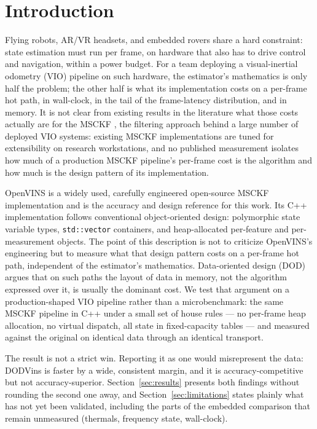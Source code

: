 \documentclass[10pt,conference,letterpaper]{IEEEtran}
\begin{document}
\section{Introduction}

Flying robots, AR/VR headsets, and embedded rovers share a hard constraint:
state estimation must run per frame, on hardware that also has to drive
control and navigation, within a power budget. For a team deploying a
visual-inertial odometry (VIO) pipeline on such hardware, the estimator's
mathematics is only half the problem; the other half is what its
implementation costs on a per-frame hot path, in wall-clock, in the tail of
the frame-latency distribution, and in memory. It is not clear from
existing results in the literature what those costs actually are for the
MSCKF \cite{mourikis2007msckf}, the filtering approach behind a large
number of deployed VIO systems: existing MSCKF implementations are tuned
for extensibility on research workstations, and no published measurement
isolates how much of a production MSCKF pipeline's per-frame cost is the
algorithm and how much is the design pattern of its implementation.

OpenVINS \cite{geneva2020openvins} is a widely used, carefully engineered
open-source MSCKF implementation and is the accuracy and design reference
for this work. Its C++ implementation follows conventional object-oriented
design: polymorphic state variable types, \texttt{std::vector} containers,
and heap-allocated per-feature and per-measurement objects. The point of
this description is not to criticize OpenVINS's engineering but to measure
what that design pattern costs on a per-frame hot path, independent of the
estimator's mathematics. Data-oriented design (DOD) \cite{fabian2018dod}
argues that on such paths the layout of data in memory, not the algorithm
expressed over it, is usually the dominant cost. We test that argument on a
production-shaped VIO pipeline rather than a microbenchmark: the same MSCKF
pipeline in C++ under a small set of house rules --- no per-frame heap
allocation, no virtual dispatch, all state in fixed-capacity tables --- and
measured against the original on identical data through an identical
transport.

The result is not a strict win. Reporting it as one would misrepresent the
data: DODVins is faster by a wide, consistent margin, and it is
accuracy-competitive but not accuracy-superior. Section~\ref{sec:results}
presents both findings without rounding the second one away, and
Section~\ref{sec:limitations} states plainly what has not yet been validated,
including the parts of the embedded comparison that remain unmeasured
(thermals, frequency state, wall-clock).
\end{document}
